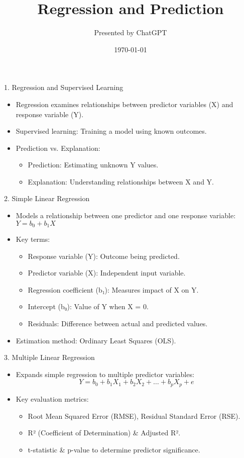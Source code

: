 \documentclass{beamer}
\title{Regression and Prediction}
\author{Presented by ChatGPT}
\date{\today}
\begin{document}
\frame{\titlepage}

\begin{frame}{1. Regression and Supervised Learning}
    \begin{itemize}
        \item Regression examines relationships between predictor variables (X) and response variable (Y).
        \item Supervised learning: Training a model using known outcomes.
        \item Prediction vs. Explanation:
        \begin{itemize}
            \item Prediction: Estimating unknown Y values.
            \item Explanation: Understanding relationships between X and Y.
        \end{itemize}
    \end{itemize}
\end{frame}

\begin{frame}{2. Simple Linear Regression}
    \begin{itemize}
        \item Models a relationship between one predictor and one response variable: \( Y = b_0 + b_1X \)
        \item Key terms:
        \begin{itemize}
            \item Response variable (Y): Outcome being predicted.
            \item Predictor variable (X): Independent input variable.
            \item Regression coefficient (b₁): Measures impact of X on Y.
            \item Intercept (b₀): Value of Y when X = 0.
            \item Residuals: Difference between actual and predicted values.
        \end{itemize}
        \item Estimation method: Ordinary Least Squares (OLS).
    \end{itemize}
\end{frame}

\begin{frame}{3. Multiple Linear Regression}
    \begin{itemize}
        \item Expands simple regression to multiple predictor variables:
        \[ Y = b_0 + b_1X_1 + b_2X_2 + \dots + b_pX_p + e \]
        \item Key evaluation metrics:
        \begin{itemize}
            \item Root Mean Squared Error (RMSE), Residual Standard Error (RSE).
            \item R² (Coefficient of Determination) & Adjusted R².
            \item t-statistic & p-value to determine predictor significance.
        \end{itemize}
    \end{itemize}
\end{frame}
\end{document}
